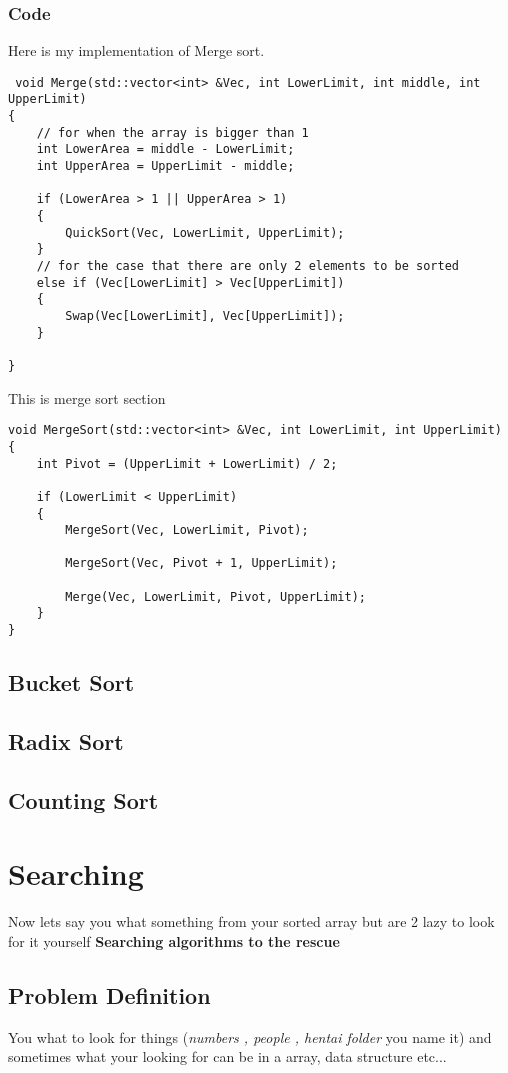 \documentclass{article}
\begin{document}
\subsubsection{Code }
Here is my implementation of Merge sort.
 \begin{lstlisting} 
 void Merge(std::vector<int> &Vec, int LowerLimit, int middle, int UpperLimit)
{
	// for when the array is bigger than 1
	int LowerArea = middle - LowerLimit;
	int UpperArea = UpperLimit - middle;

	if (LowerArea > 1 || UpperArea > 1)
	{
		QuickSort(Vec, LowerLimit, UpperLimit);
	}
	// for the case that there are only 2 elements to be sorted 
	else if (Vec[LowerLimit] > Vec[UpperLimit])
	{
		Swap(Vec[LowerLimit], Vec[UpperLimit]);
	}

}
\end{lstlisting} 
 This is merge sort section
\begin{lstlisting} 
void MergeSort(std::vector<int> &Vec, int LowerLimit, int UpperLimit)
{
	int Pivot = (UpperLimit + LowerLimit) / 2;

	if (LowerLimit < UpperLimit)
	{
		MergeSort(Vec, LowerLimit, Pivot);

		MergeSort(Vec, Pivot + 1, UpperLimit);

		Merge(Vec, LowerLimit, Pivot, UpperLimit);
	}
}
\end{lstlisting} 
\subsection{Bucket Sort}
   
\subsection{Radix Sort} 
\subsection{Counting Sort}

 \section{Searching}
Now lets say you what something from your sorted array but are 2 lazy to look for it yourself \textbf{Searching algorithms to the rescue} 
\subsection{Problem Definition}\label{subsec:Problem Searching}
You what to look for things (\textit{numbers , people , hentai folder} you name it) and sometimes what your looking for can be in a array, data structure etc... 
\end{document}
